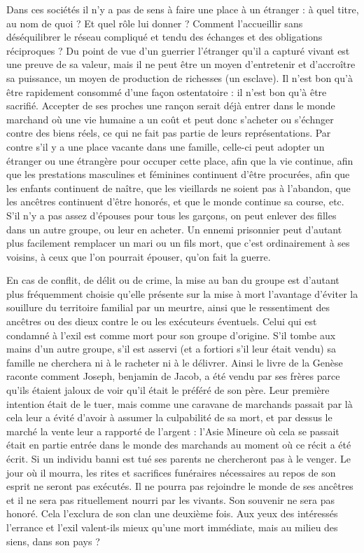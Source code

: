 Dans ces sociétés il n'y a pas de sens à faire une place à un étranger : à quel titre, au nom de quoi ? Et quel rôle lui donner ? Comment l'accueillir sans déséquilibrer le réseau compliqué et tendu des échanges et des obligations réciproques ? Du point de vue d'un guerrier l'étranger qu’il a capturé vivant est une preuve de sa valeur, mais il ne peut être un moyen d'entretenir et d'accroître sa puissance, un moyen de production de richesses (un esclave). Il n'est bon qu'à être rapidement consommé d'une façon ostentatoire : il n'est bon qu'à être sacrifié. Accepter de ses proches une rançon serait déjà entrer dans le monde marchand où une vie humaine a un coût et peut donc s'acheter ou s'échnger contre des biens réels, ce qui ne fait pas partie de leurs représentations.
Par contre s'il y a une place vacante dans une famille, celle-ci peut adopter un étranger ou une étrangère pour occuper cette place, afin que la vie continue, afin que les prestations masculines et féminines continuent d'être procurées, afin que les enfants continuent de naître, que les vieillards ne soient pas à l'abandon, que les ancêtres continuent d'être honorés, et que le monde continue sa course, etc. S'il n'y a pas assez d'épouses pour tous les garçons, on peut enlever des filles dans un autre groupe, ou leur en acheter. Un ennemi prisonnier peut d'autant plus facilement remplacer un mari ou un fils mort, que c'est ordinairement à ses voisins, à ceux que l'on pourrait épouser, qu'on fait la guerre.

En cas de conflit, de délit ou de crime, la mise au ban du groupe est d'autant plus fréquemment choisie qu'elle présente sur la mise à mort l'avantage d'éviter la souillure du territoire familial par un meurtre, ainsi que le ressentiment des ancêtres ou des dieux contre le ou les exécuteurs éventuels. Celui qui est condamné à l'exil est comme mort pour son groupe d'origine. S'il tombe aux mains d'un autre groupe, s'il est asservi (et a fortiori s'il leur était vendu) sa famille ne cherchera ni à le racheter ni à le délivrer. Ainsi le livre de la Genèse raconte comment Joseph, benjamin de Jacob, a été vendu par ses frères parce qu'ils étaient jaloux de voir qu'il était le préféré de son père. Leur première intention était de le tuer, mais comme une caravane de marchands passait par là cela leur a évité d'avoir à assumer la culpabilité de sa mort, et par dessus le marché la vente leur a rapporté de l'argent : l'Asie Mineure où cela se passait était en partie entrée dans le monde des marchands au moment où ce récit a été écrit. 
Si un individu banni est tué ses parents ne chercheront pas à le venger. Le jour où il mourra, les rites et sacrifices funéraires nécessaires au repos de son esprit ne seront pas exécutés. Il ne pourra pas rejoindre le monde de ses ancêtres et il ne sera pas rituellement nourri par les vivants. Son souvenir ne sera pas honoré. Cela l'exclura de son clan une deuxième fois. Aux yeux des intéressés l'errance et l'exil valent-ils mieux qu'une mort immédiate, mais au milieu des siens, dans son pays ?



